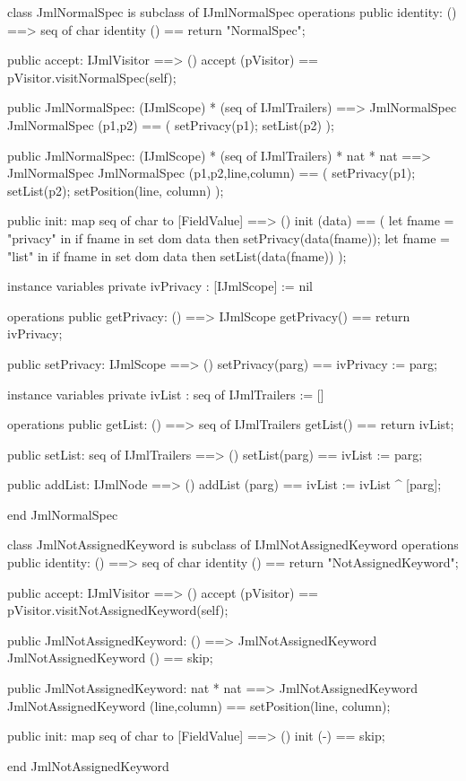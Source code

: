 \begin{vdm_al}
class JmlNormalSpec is subclass of IJmlNormalSpec
operations
  public identity: () ==> seq of char
  identity () == return "NormalSpec";

  public accept: IJmlVisitor ==> ()
  accept (pVisitor) == pVisitor.visitNormalSpec(self);

  public JmlNormalSpec:
    (IJmlScope) *
    (seq of IJmlTrailers) ==> JmlNormalSpec
  JmlNormalSpec (p1,p2) == 
    ( setPrivacy(p1);
      setList(p2) );

  public JmlNormalSpec:
    (IJmlScope) *
    (seq of IJmlTrailers) *
    nat *
    nat ==> JmlNormalSpec
  JmlNormalSpec (p1,p2,line,column) == 
    ( setPrivacy(p1);
      setList(p2);
      setPosition(line, column) );

  public init: map seq of char to [FieldValue] ==> ()
  init (data) ==
    ( let fname = "privacy" in
        if fname in set dom data
        then setPrivacy(data(fname));
      let fname = "list" in
        if fname in set dom data
        then setList(data(fname)) );

instance variables
  private ivPrivacy : [IJmlScope] := nil

operations
  public getPrivacy: () ==> IJmlScope
  getPrivacy() == return ivPrivacy;

  public setPrivacy: IJmlScope ==> ()
  setPrivacy(parg) == ivPrivacy := parg;

instance variables
  private ivList : seq of IJmlTrailers := []

operations
  public getList: () ==> seq of IJmlTrailers
  getList() == return ivList;

  public setList: seq of IJmlTrailers ==> ()
  setList(parg) == ivList := parg;

  public addList: IJmlNode ==> ()
  addList (parg) == ivList := ivList ^ [parg];

end JmlNormalSpec
\end{vdm_al}

\begin{vdm_al}
class JmlNotAssignedKeyword is subclass of IJmlNotAssignedKeyword
operations
  public identity: () ==> seq of char
  identity () == return "NotAssignedKeyword";

  public accept: IJmlVisitor ==> ()
  accept (pVisitor) == pVisitor.visitNotAssignedKeyword(self);

  public JmlNotAssignedKeyword:
    () ==> JmlNotAssignedKeyword
  JmlNotAssignedKeyword () == 
    skip;

  public JmlNotAssignedKeyword:
    nat *
    nat ==> JmlNotAssignedKeyword
  JmlNotAssignedKeyword (line,column) == 
    setPosition(line, column);

  public init: map seq of char to [FieldValue] ==> ()
  init (-) == skip;

end JmlNotAssignedKeyword
\end{vdm_al}

